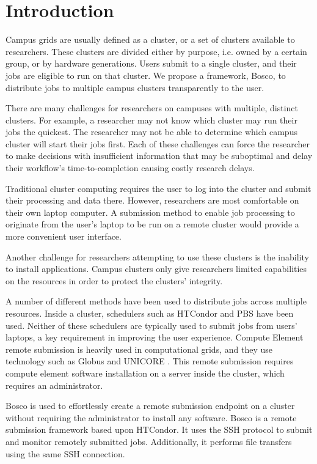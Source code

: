 \label{chapter:campusjobs} 
\section{Introduction}

Campus grids are usually defined as a cluster, or a set of clusters available to researchers.  These clusters are divided either by purpose, i.e. owned by a certain group, or by hardware generations.  Users submit to a single cluster, and their jobs are eligible to run on that cluster.  We propose a framework, Bosco, to distribute jobs to multiple campus clusters transparently to the user. 

There are many challenges for researchers on campuses with multiple, distinct clusters.  For example, a researcher may not know which cluster may run their jobs the quickest.  The researcher may not be able to determine which campus cluster will start their jobs first.  Each of these challenges can force the researcher to make decisions with insufficient information that may be suboptimal and delay their workflow's time-to-completion causing costly research delays.

Traditional cluster computing requires the user to log into the cluster and submit their processing and data there. However, researchers are most comfortable on their own laptop computer.  A submission method to enable job processing to originate from the user's laptop to be run on a remote cluster would provide a more convenient user interface.

Another challenge for researchers attempting to use these clusters is the inability to install applications.  Campus clusters only give researchers limited capabilities on the resources in order to protect the clusters' integrity.

A number of different methods have been used to distribute jobs across multiple resources.  Inside a cluster, schedulers such as HTCondor  \cite{litzkow1988condor} and PBS \cite{henderson1995job} have been used.  Neither of these schedulers are typically used to submit jobs from users' laptops, a key requirement in improving the user experience.  Compute Element remote submission is heavily used in computational grids, and they use technology such as Globus \cite{foster2001globus} and UNICORE \cite{romberg2002unicore}. This remote submission requires compute element software installation on a server inside the cluster, which requires an administrator.

Bosco \cite{weitzel2014accessing} is used to effortlessly create a remote submission endpoint on a cluster without requiring the administrator to install any software.  Bosco is a remote submission framework based upon HTCondor.  It uses the SSH \cite{ylonen2006secure} protocol to submit and monitor remotely submitted jobs.  Additionally, it performs file transfers using the same SSH connection.

